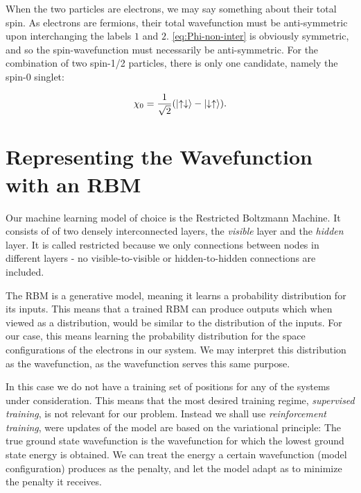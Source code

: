 \documentclass[a4paper, 11pt]{article}
\begin{document}
\begin{multicols}{2}
    When the two particles are electrons, we may say something about their total
    spin. As electrons are fermions, their total wavefunction must be
    anti-symmetric upon interchanging the labels $1$ and $2$.
    \autoref{eq:Phi-non-inter} is obviously symmetric, and so the
    spin-wavefunction must necessarily be anti-symmetric. For the combination of
    two spin-1/2 particles, there is only one candidate, namely the spin-0
    singlet:

    \begin{align}
        \chi_0 = \frac{1}{\sqrt 2}\qty(\ket{\uparrow\downarrow} -
        \ket{\downarrow\uparrow}).
    \end{align}

    \section{Representing the Wavefunction with an RBM}

    Our machine learning model of choice is the Restricted Boltzmann Machine. It
    consists of of two densely interconnected layers, the \emph{visible} layer
    and the \emph{hidden} layer. It is called restricted because we only
    connections between nodes in different layers - no visible-to-visible or
    hidden-to-hidden connections are included.

    The RBM is a generative model, meaning it learns a probability distribution
    for its inputs. This means that a trained RBM can produce outputs which
    when viewed as a distribution, would be similar to the distribution of the
    inputs. For our case, this means learning the probability distribution for
    the space configurations of the electrons in our system. We may interpret
    this distribution as the wavefunction, as the wavefunction serves this same
    purpose.

    In this case we do not have a training set of positions for any of the
    systems under consideration. This means that the most desired training
    regime, \emph{supervised training}, is not relevant for our problem. Instead
    we shall use \emph{reinforcement training}, were updates of the model are
    based on the variational principle: The true ground state wavefunction is
    the wavefunction for which the lowest ground state energy is obtained. We
    can treat the energy a certain wavefunction (model configuration) produces
    as the penalty, and let the model adapt as to minimize the penalty it
    receives.
    

\end{multicols}
\end{document}

